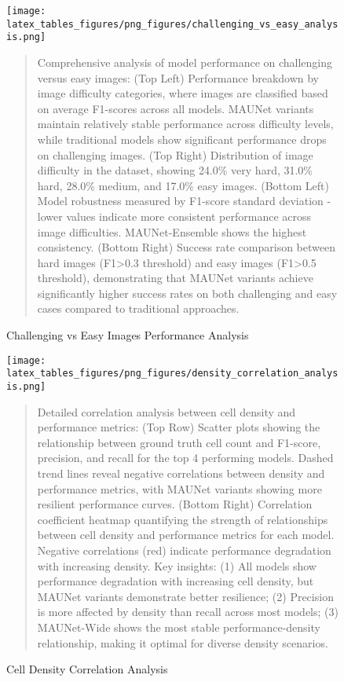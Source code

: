 \begin{figure}[htbp]
\centering
\texttt{[image: latex\_tables\_figures/png\_figures/challenging\_vs\_easy\_analysis.png]}
\caption{Challenging vs Easy Images Performance Analysis}
\label{fig:challenging_vs_easy_analysis}
\begin{quote}
\small
Comprehensive analysis of model performance on challenging versus easy images: (Top Left) Performance breakdown by image difficulty categories, where images are classified based on average F1-scores across all models. MAUNet variants maintain relatively stable performance across difficulty levels, while traditional models show significant performance drops on challenging images. (Top Right) Distribution of image difficulty in the dataset, showing 24.0\% very hard, 31.0\% hard, 28.0\% medium, and 17.0\% easy images. (Bottom Left) Model robustness measured by F1-score standard deviation - lower values indicate more consistent performance across image difficulties. MAUNet-Ensemble shows the highest consistency. (Bottom Right) Success rate comparison between hard images (F1>0.3 threshold) and easy images (F1>0.5 threshold), demonstrating that MAUNet variants achieve significantly higher success rates on both challenging and easy cases compared to traditional approaches.
\end{quote}
\end{figure}

\begin{figure}[htbp]
\centering
\texttt{[image: latex\_tables\_figures/png\_figures/density\_correlation\_analysis.png]}
\caption{Cell Density Correlation Analysis}
\label{fig:density_correlation_analysis}
\begin{quote}
\small
Detailed correlation analysis between cell density and performance metrics: (Top Row) Scatter plots showing the relationship between ground truth cell count and F1-score, precision, and recall for the top 4 performing models. Dashed trend lines reveal negative correlations between density and performance metrics, with MAUNet variants showing more resilient performance curves. (Bottom Right) Correlation coefficient heatmap quantifying the strength of relationships between cell density and performance metrics for each model. Negative correlations (red) indicate performance degradation with increasing density. Key insights: (1) All models show performance degradation with increasing cell density, but MAUNet variants demonstrate better resilience; (2) Precision is more affected by density than recall across most models; (3) MAUNet-Wide shows the most stable performance-density relationship, making it optimal for diverse density scenarios.
\end{quote}
\end{figure}

